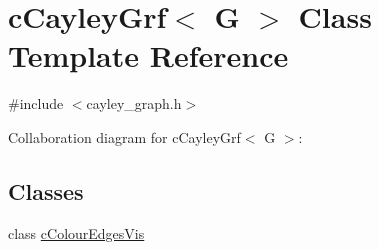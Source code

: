 \hypertarget{classcCayleyGrf}{\section{c\-Cayley\-Grf$<$ G $>$ Class Template Reference}
\label{classcCayleyGrf}
}


{\ttfamily \#include $<$cayley\-\_\-graph.\-h$>$}



Collaboration diagram for c\-Cayley\-Grf$<$ G $>$\-:
\subsection*{Classes}
\begin{DoxyCompactItemize}
\item 
class \hyperlink{classcCayleyGrf_1_1cColourEdgesVis}{c\-Colour\-Edges\-Vis}
\end{DoxyCompactItemize}
